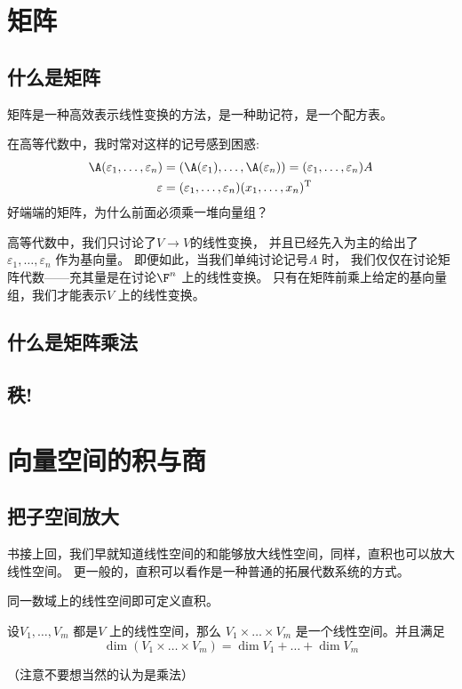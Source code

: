 \section{矩阵}
\subsection{什么是矩阵}
矩阵是一种高效表示线性变换的方法，是一种助记符，是一个配方表。

在高等代数中，我时常对这样的记号感到困惑:
\begin{align*}
    \A(\varepsilon_{1}, \dots, \varepsilon_{n}) &=
    (\A(\varepsilon_{1}), \dots,
    \A(\varepsilon_{n})) = (\varepsilon_{1},
    \dots, \varepsilon_{n})A\\
    \varepsilon &= (\varepsilon_{1}, \dots, \varepsilon_{n})
    (x_{1}, \dots,   x_{n})^{\mathrm{T}}
\end{align*}
好端端的矩阵，为什么前面必须乘一堆向量组？

高等代数中，我们只讨论了\(V \to V\)的线性变换，
并且已经先入为主的给出了\(\varepsilon_{1}, \dots, \varepsilon_{n}\) 作为基向量。
即便如此，当我们单纯讨论记号\(A\) 时，
我们仅仅在讨论矩阵代数——充其量是在讨论\(\F^{n}\) 上的线性变换。
只有在矩阵前乘上给定的基向量组，我们才能表示\(V\) 上的线性变换。

\subsection{什么是矩阵乘法}
\subsection{秩!}
\section{向量空间的积与商}
\subsection{把子空间放大}
书接上回，我们早就知道线性空间的和能够放大线性空间，同样，直积也可以放大线性空间。
更一般的，直积可以看作是一种普通的拓展代数系统的方式。

同一数域上的线性空间即可定义直积。

\begin{theorem}
    设\(V_1, \dots , V_{m}\) 都是\(V\) 上的线性空间，那么 \(V_{1}
    \times \dots \times V_{m}\) 是一个线性空间。并且满足\[
        \dim (V_{1} \times \dots \times V_{m}) = \dim V_{1}
        + \dots + \dim V_{m}
    \]
\end{theorem}
（注意不要想当然的认为是乘法）

